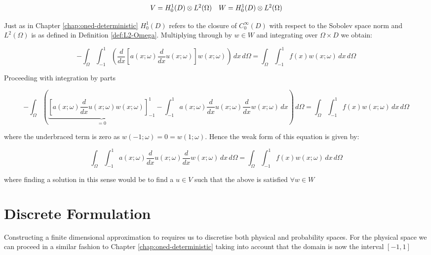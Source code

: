\begin{equation}
    \begin{array}{c c}
        V = H^1_0(D) \otimes L^2(\Omega) &
        W = H^1_0(D) \otimes L^2(\Omega)
    \end{array}
\end{equation}

Just as in Chapter \ref{chap:oned-deterministic} $H^1_0(D)$ refers to the
closure of $C_0^\infty(D)$ with respect to the Sobolev space norm
 and $L^2(\Omega)$ is as defined in Definition
\ref{def:L2-Omega}. Multiplying through by $w \in W$ and integrating over
$\Omega \times D$ we obtain:

\begin{equation}
    -\int_{\Omega}\int_{-1}^1\left(\frac{d}{dx}\left[a(x;\omega)\frac{d}{dx}u(x;\omega)\right]
    w(x;\omega)\right)\, dx\, d\Omega = \int_{\Omega}\int_{-1}^1 f(x)w(x;\omega)\, dx\, d\Omega
\end{equation}

Proceeding with integration by parts

\begin{equation}
    -\int_{\Omega}\left(
      \underbrace{\left[a(x;\omega)\frac{d}{dx}u(x;\omega)
                        w(x;\omega)\right]_{-1}^1}_{= 0}
       -\int_{-1}^1a(x;\omega)\frac{d}{dx}u(x;\omega)\frac{d}{dx}w(x;\omega)\, dx
    \right)\, d\Omega = \int_{\Omega}\int_{-1}^1 f(x)w(x;\omega)\, dx\, d\Omega
\end{equation}

where the underbraced term is zero as $w(-1;\omega) = 0 = w(1;\omega)$. Hence
the weak form of this equation is given by:

\begin{equation}\label{eq:wk-one-d-stochastic}
    \int_{\Omega}\int_{-1}^1a(x;\omega)
           \frac{d}{dx}u(x;\omega)\frac{d}{dx}w(x;\omega)\, dx\, d\Omega =
           \int_{\Omega}\int_{-1}^1 f(x)w(x;\omega)\, dx\, d\Omega
\end{equation}

where finding a solution in this sense would be to find a $u \in V$ such that
the above is satisfied $\forall w \in W$

\section{Discrete Formulation}

Constructing a finite dimensional approximation to
 requires us to discretise both physical and
probability spaces. For the physical space we can proceed in a similar fashion
to Chapter \ref{chap:oned-deterministic} taking into account that the domain
is now the interval $[-1, 1]$

